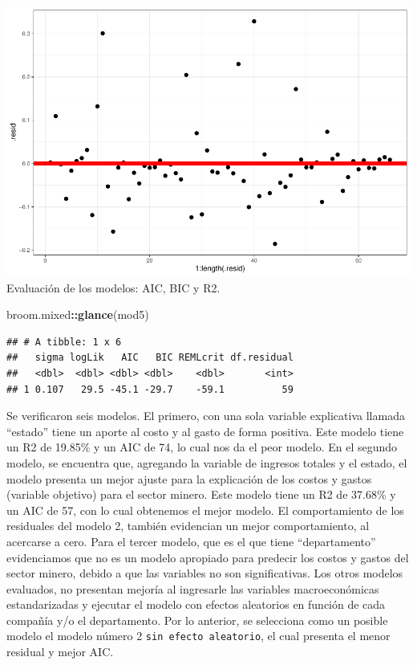 \documentclass[
  11pt,
  a4paper,
]{book}
\newenvironment{Shaded}{\begin{snugshade}}{\end{snugshade}}
\newcommand{\KeywordTok}[1]{\textcolor[rgb]{0.13,0.29,0.53}{\textbf{#1}}}
\newcommand{\NormalTok}[1]{#1}
\newcommand{\OperatorTok}[1]{\textcolor[rgb]{0.81,0.36,0.00}{\textbf{#1}}}
\begin{document}
\includegraphics{index_files/figure-latex/unnamed-chunk-28-1.pdf}
Evaluación de los modelos: AIC, BIC y R2.

\begin{Shaded}
\begin{Highlighting}[]
\NormalTok{broom.mixed}\OperatorTok{::}\KeywordTok{glance}\NormalTok{(mod5)}
\end{Highlighting}
\end{Shaded}

\begin{verbatim}
## # A tibble: 1 x 6
##   sigma logLik   AIC   BIC REMLcrit df.residual
##   <dbl>  <dbl> <dbl> <dbl>    <dbl>       <int>
## 1 0.107   29.5 -45.1 -29.7    -59.1          59
\end{verbatim}

Se verificaron seis modelos. El primero, con una sola variable
explicativa llamada ``estado'' tiene un aporte al costo y al gasto de
forma positiva. Este modelo tiene un R2 de 19.85\% y un AIC de 74, lo
cual nos da el peor modelo. En el segundo modelo, se encuentra que,
agregando la variable de ingresos totales y el estado, el modelo
presenta un mejor ajuste para la explicación de los costos y gastos
(variable objetivo) para el sector minero. Este modelo tiene un R2 de
37.68\% y un AIC de 57, con lo cual obtenemos el mejor modelo. El
comportamiento de los residuales del modelo 2, también evidencian un
mejor comportamiento, al acercarse a cero. Para el tercer modelo, que es
el que tiene ``departamento'' evidenciamos que no es un modelo apropiado
para predecir los costos y gastos del sector minero, debido a que las
variables no son significativas. Los otros modelos evaluados, no
presentan mejoría al ingresarle las variables macroeconómicas
estandarizadas y ejecutar el modelo con efectos aleatorios en función de
cada compañía y/o el departamento. Por lo anterior, se selecciona como
un posible modelo el modelo número 2 \texttt{sin\ efecto\ aleatorio}, el
cual presenta el menor residual y mejor AIC.
\end{document}
